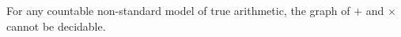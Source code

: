 \documentclass[a4paper]{article}
\newcommand\clet{\mathsf{let}\;}
\newcommand\cin{\;\mathsf{in}\;}
\newcommand\cif{{\color{blue} \mathsf{if}\;}}
\newcommand\cthen{{\color{blue}\;\mathsf{then}\;}}
\newcommand\celse{{\color{blue}\;\mathsf{else}\;}}
\begin{document}
\begin{thm}
  For any countable non-standard model of true arithmetic, the graph of $+$ and $\times$ cannot be decidable.
\end{thm}

%
%
%
%
%
%
\end{document}
